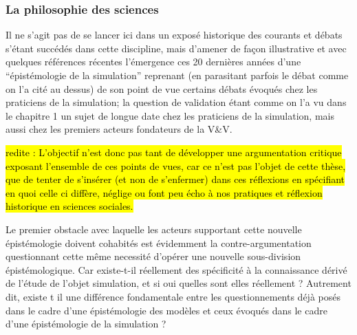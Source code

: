 \subsubsection{La philosophie des sciences}
\label{sssec:philo_sciences}

Il ne s'agit pas de se lancer ici dans un exposé historique des courants et débats s'étant succédés dans cette discipline, mais d'amener de façon illustrative et avec quelques références récentes l'émergence ces 20 dernières années d'une \enquote{épistémologie de la simulation} reprenant (en parasitant parfois le débat comme on l'a cité au dessus) de son point de vue certains débats évoqués chez les praticiens de la simulation; la question de validation étant comme on l'a vu dans le chapitre 1 un sujet de longue date chez les praticiens de la simulation, mais aussi chez les premiers acteurs fondateurs de la V\&V.

\hl{redite : L'objectif n'est donc pas tant de développer une argumentation critique exposant l'ensemble de ces points de vues, car ce n'est pas l'objet de cette thèse, que de tenter de s'insérer (et non de s'enfermer) dans ces réflexions en spécifiant en quoi celle ci diffère, néglige ou font peu écho à nos pratiques et réflexion historique en sciences sociales.}

Le premier obstacle avec laquelle les acteurs supportant cette nouvelle épistémologie doivent cohabités est évidemment la contre-argumentation questionnant cette même necessité d'opérer une nouvelle sous-division épistémologique. Car existe-t-il réellement des spécificité à la connaissance dérivé de l'étude de l'objet simulation, et si oui quelles sont elles réellement ? Autrement dit, existe t il une différence fondamentale entre les questionnements déjà posés dans le cadre d'une épistémologie des modèles et ceux évoqués dans le cadre d'une épistémologie de la simulation ?


